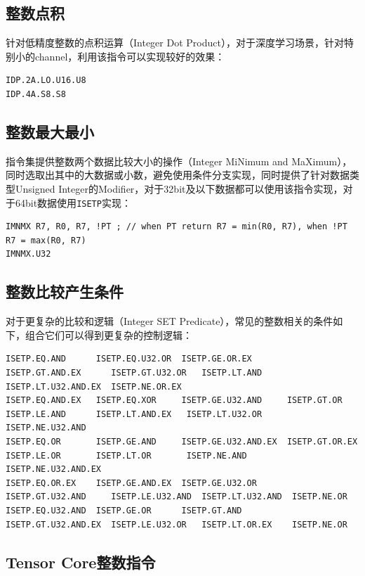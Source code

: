 \subsection{整数点积}

针对低精度整数的点积运算（Integer Dot Product），对于深度学习场景，针对特别小的channel，利用该指令可以实现较好的效果：

\begin{lstlisting}
IDP.2A.LO.U16.U8
IDP.4A.S8.S8
\end{lstlisting}

\subsection{整数最大最小}

指令集提供整数两个数据比较大小的操作（Integer MiNimum and MaXimum），同时选取出其中的大数据或小数，避免使用条件分支实现，同时提供了针对数据类型Unsigned Integer的Modifier，对于32bit及以下数据都可以使用该指令实现，对于64bit数据使用\lstinline|ISETP|实现：

\begin{lstlisting}
IMNMX R7, R0, R7, !PT ; // when PT return R7 = min(R0, R7), when !PT R7 = max(R0, R7)
IMNMX.U32
\end{lstlisting}

\subsection{整数比较产生条件}

对于更复杂的比较和逻辑（Integer SET Predicate），常见的整数相关的条件如下，组合它们可以得到更复杂的控制逻辑：

\begin{lstlisting}
ISETP.EQ.AND      ISETP.EQ.U32.OR  ISETP.GE.OR.EX       ISETP.GT.AND.EX      ISETP.GT.U32.OR   ISETP.LT.AND      ISETP.LT.U32.AND.EX  ISETP.NE.OR.EX
ISETP.EQ.AND.EX   ISETP.EQ.XOR     ISETP.GE.U32.AND     ISETP.GT.OR          ISETP.LE.AND      ISETP.LT.AND.EX   ISETP.LT.U32.OR      ISETP.NE.U32.AND
ISETP.EQ.OR       ISETP.GE.AND     ISETP.GE.U32.AND.EX  ISETP.GT.OR.EX       ISETP.LE.OR       ISETP.LT.OR       ISETP.NE.AND         ISETP.NE.U32.AND.EX
ISETP.EQ.OR.EX    ISETP.GE.AND.EX  ISETP.GE.U32.OR      ISETP.GT.U32.AND     ISETP.LE.U32.AND  ISETP.LT.U32.AND  ISETP.NE.OR
ISETP.EQ.U32.AND  ISETP.GE.OR      ISETP.GT.AND         ISETP.GT.U32.AND.EX  ISETP.LE.U32.OR   ISETP.LT.OR.EX    ISETP.NE.OR
\end{lstlisting}

\subsection{Tensor Core整数指令}

